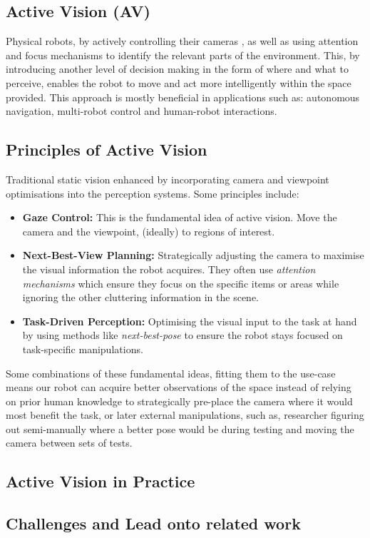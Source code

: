   \subsection{Active Vision (AV)}
    Physical robots, by actively controlling their cameras \cite{Aloimonos1988}, as well as using attention and focus mechanisms to identify the relevant parts of the environment. This, by introducing another level of decision making in the form of where and what to perceive, enables the robot to move and act more intelligently within the space provided. This approach is mostly beneficial in applications such as: autonomous navigation, multi-robot control and human-robot interactions. \cite{breazeal2001hri}
    
    \subsection{Principles of Active Vision}
    Traditional static vision enhanced by incorporating camera and viewpoint optimisations into the perception systems. Some principles include:
    \begin{itemize}
      \item \textbf{Gaze Control:} This is the fundamental idea of active vision. Move the camera and the viewpoint, (ideally) to regions of interest.
      \item \textbf{Next-Best-View Planning:} Strategically adjusting the camera to maximise the visual information the robot acquires. They often use \emph{attention mechanisms} which ensure they focus on the specific items or areas \cite{Burusa_2024} while ignoring the other cluttering information in the scene. 
      \item \textbf{Task-Driven Perception:} Optimising the visual input to the task at hand by using methods like \emph{next-best-pose} to ensure the robot stays focused on task-specific manipulations.
    \end{itemize}
    Some combinations of these fundamental ideas, fitting them to the use-case means our robot can acquire better observations of the space instead of relying on prior human knowledge to strategically pre-place the camera where it would most benefit the task, or later external manipulations, such as, researcher figuring out semi-manually where a better pose would be during testing and moving the camera between sets of tests.

  \subsection{Active Vision in Practice}
  \subsection{Challenges and Lead onto related work}

    